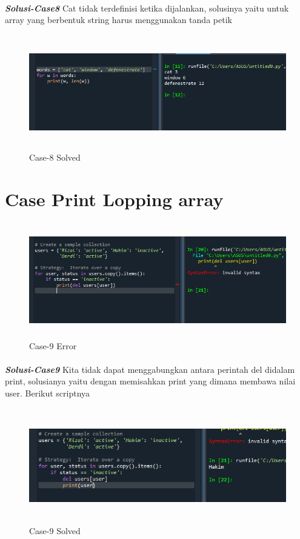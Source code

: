 \documentclass[12pt,a4paper]{article}
\begin{document}
\paragraph{}\textbf{\textit{Solusi-Case8}} {Cat tidak terdefinisi ketika dijalankan, solusinya yaitu untuk array yang berbentuk string harus menggunakan tanda petik}
\begin{figure}[ht]
    \centerline{\includegraphics[width=15cm,height=5cm]{image/case8-solved.png}}
    \renewcommand{\figurename}{Gambar}
    \caption{Case-8 Solved}
\end{figure}

\newpage
\section{Case Print Lopping array}
\begin{figure}[ht]
    \centerline{\includegraphics[width=15cm,height=5cm]{image/case9.png}}
    \renewcommand{\figurename}{Gambar}
    \caption{Case-9 Error}
\end{figure}
\paragraph{}\textbf{\textit{Solusi-Case9}} {Kita tidak dapat menggabungkan antara perintah del didalam print, solusianya yaitu dengan memisahkan print yang dimana membawa nilai user. Berikut scriptnya}
\begin{figure}[ht]
    \centerline{\includegraphics[width=15cm,height=5cm]{image/case9-solved.png}}
    \renewcommand{\figurename}{Gambar}
    \caption{Case-9 Solved}
\end{figure}
\end{document}

